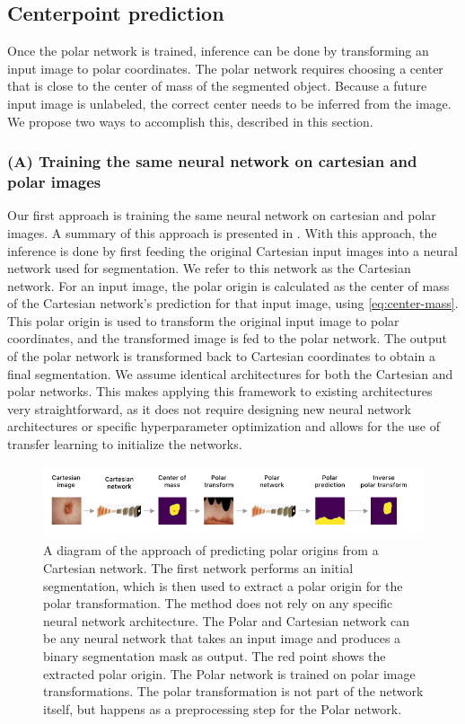     \subsection{Centerpoint prediction}
    
Once the polar network is trained, inference can be done by transforming an input image to polar 
coordinates. The polar network requires choosing a center that is close to the center of mass of the 
segmented object. Because a future input image is unlabeled, the correct center needs to be inferred from 
the image. We propose two ways to accomplish this, described in this section.

   \subsubsection{(A) Training the same neural network on cartesian and polar images}
   \label{retraining-approach}
   
Our first approach is training the same neural network on cartesian and polar images. A summary of this
approach is presented in . With this approach, 
the inference is done by first feeding the original Cartesian input images into a neural 
network used for segmentation. We refer to this network as the Cartesian network.
For an input image, the polar origin is calculated as the center of mass of the Cartesian network's
prediction for that input image, using \eqref{eq:center-mass}.
This polar origin is used to transform the original input image to polar coordinates, and the transformed 
image is fed
to the polar network. The output of the polar network is transformed back to Cartesian coordinates
to obtain a final segmentation. We assume 
identical architectures for both the Cartesian and polar networks. This makes applying this
framework to existing architectures very straightforward, as it does not require designing new neural 
network architectures or specific hyperparameter optimization and allows for the use of transfer learning to
initialize the networks.

	\begin{figure}[h!]
		\centering
		\includegraphics[width=\linewidth]{images/4/retraining-approach}
		\caption{A diagram of the approach of predicting polar origins from a Cartesian network. The first network performs an initial segmentation, which is then used to extract a polar origin for the polar transformation. The method does not rely on any specific neural network architecture. The Polar and Cartesian network can be any neural network that takes an input image and produces a binary segmentation mask as output. The red point shows the extracted polar origin. The Polar network is trained on polar image transformations. The polar transformation is not part of the network itself, but happens as a preprocessing step for the Polar network. \cite{bencevicTrainingPolarImage2021}}
		\label{fig:retraining-diagram}
	\end{figure}
	
